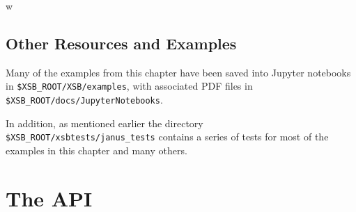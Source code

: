
%
%
%
w%

\subsection{Other \januspy{} Resources and Examples}

Many of the examples from this chapter have been saved into Jupyter
notebooks in {\tt \$XSB\_ROOT/XSB/examples}, with associated PDF files in
{\tt \$XSB\_ROOT/docs/JupyterNotebooks}.

In addition, as mentioned earlier the directory {\tt
  \$XSB\_ROOT/xsbtests/janus\_tests} contains a series of tests for
most of the examples in this chapter and many others.
\section{The \januspy{} API}

